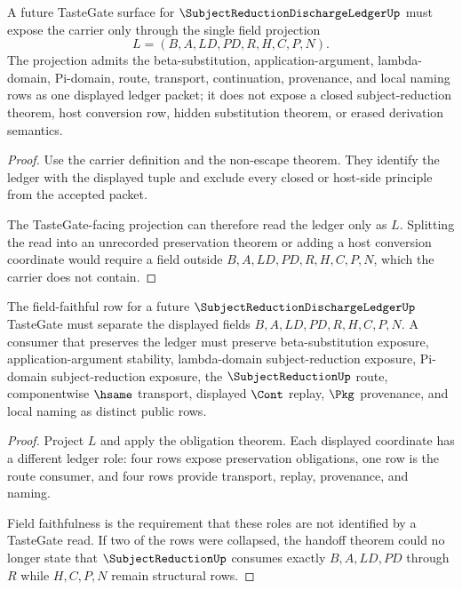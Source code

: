 \begin{theorem}
\label{thm:subject-reduction-discharge-ledger-taste-gate-boundary}
A future TasteGate surface for $\SubjectReductionDischargeLedgerUp$ must expose the carrier only through the single field projection
$$
L=(B,A,LD,PD,R,H,C,P,N).
$$
The projection admits the beta-substitution, application-argument, lambda-domain, Pi-domain, route, transport, continuation, provenance, and local naming rows as one displayed ledger packet; it does not expose a closed subject-reduction theorem, host conversion row, hidden substitution theorem, or erased derivation semantics.
\end{theorem}
\begin{proof}
Use the carrier definition and the non-escape theorem. They identify the ledger with the displayed tuple and exclude every closed or host-side principle from the accepted packet.

The TasteGate-facing projection can therefore read the ledger only as $L$. Splitting the read into an unrecorded preservation theorem or adding a host conversion coordinate would require a field outside $B,A,LD,PD,R,H,C,P,N$, which the carrier does not contain.
\end{proof}
\begin{theorem}
\label{thm:subject-reduction-discharge-ledger-field-faithful-surface}
The field-faithful row for a future $\SubjectReductionDischargeLedgerUp$ TasteGate must separate the displayed fields $B,A,LD,PD,R,H,C,P,N$. A consumer that preserves the ledger must preserve beta-substitution exposure, application-argument stability, lambda-domain subject-reduction exposure, Pi-domain subject-reduction exposure, the $\SubjectReductionUp$ route, componentwise $\hsame$ transport, displayed $\Cont$ replay, $\Pkg$ provenance, and local naming as distinct public rows.
\end{theorem}
\begin{proof}
Project $L$ and apply the obligation theorem. Each displayed coordinate has a different ledger role: four rows expose preservation obligations, one row is the route consumer, and four rows provide transport, replay, provenance, and naming.

Field faithfulness is the requirement that these roles are not identified by a TasteGate read. If two of the rows were collapsed, the handoff theorem could no longer state that $\SubjectReductionUp$ consumes exactly $B,A,LD,PD$ through $R$ while $H,C,P,N$ remain structural rows.
\end{proof}

